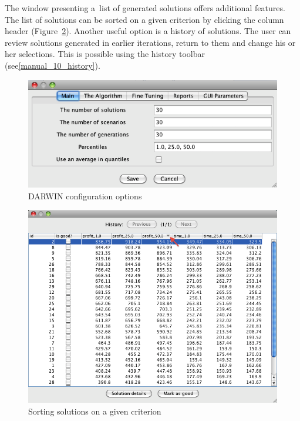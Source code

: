 The window presenting a~list of generated solutions offers additional
features. The list of solutions can be sorted on a given criterion by clicking
the column header (Figure~\ref{manual_09_sorton}). Another useful option is a
history of solutions. The user can review solutions generated in earlier
iterations, return to them and change his or her selections. This is possible
using the history toolbar (see\ref{manual_10_history}).

\begin{figure}
  \centering
  \includegraphics[scale=0.7]{img/manual/08_options}
  \caption{DARWIN configuration options}
  \label{manual_08_options}
\end{figure}

\begin{figure}
  \centering
  \includegraphics[scale=0.7]{img/manual/09_sorton}
  \caption{Sorting solutions on a given criterion}
  \label{manual_09_sorton}
\end{figure}

